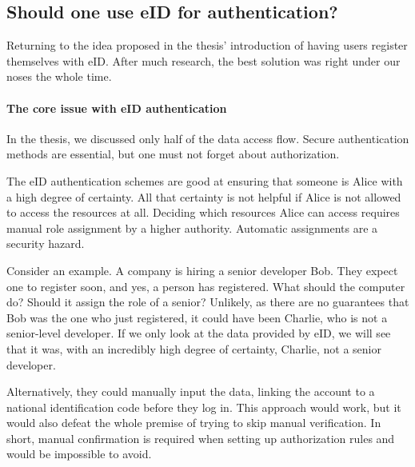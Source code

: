 

\subsection{Should one use eID for authentication?}

Returning to the idea proposed in the thesis' introduction of having users register themselves with eID. After much research, the best solution was right under our noses the whole time.

\paragraph{The core issue with eID authentication}

In the thesis, we discussed only half of the data access flow. Secure authentication methods are essential, but one must not forget about authorization.

The eID authentication schemes are good at ensuring that someone is Alice with a high degree of certainty. All that certainty is not helpful if Alice is not allowed to access the resources at all. Deciding which resources Alice can access requires manual role assignment by a higher authority. Automatic assignments are a security hazard.

Consider an example. A company is hiring a senior developer Bob. They expect one to register soon, and yes, a person has registered. What should the computer do? Should it assign the role of a senior? Unlikely, as there are no guarantees that Bob was the one who just registered, it could have been Charlie, who is not a senior-level developer. If we only look at the data provided by eID, we will see that it was, with an incredibly high degree of certainty, Charlie, not a senior developer.

Alternatively, they could manually input the data, linking the account to a national identification code before they log in. This approach would work, but it would also defeat the whole premise of trying to skip manual verification. In short, manual confirmation is required when setting up authorization rules and would be impossible to avoid.

